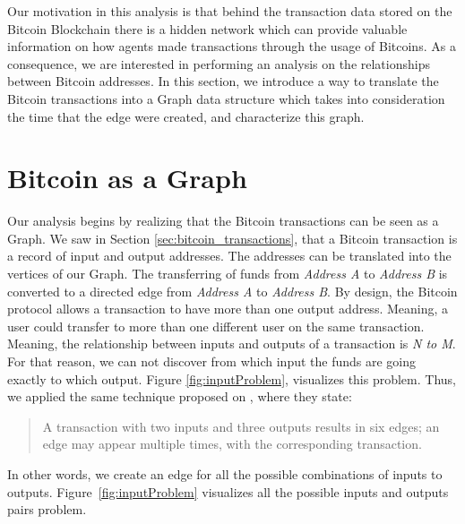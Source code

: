 \documentclass[../../thesis.tex]{subfiles}
\begin{document}
    Our motivation in this analysis is that behind the transaction data stored on the Bitcoin Blockchain there is a hidden network which can provide valuable information on how agents made transactions through the usage of Bitcoins. As a consequence, we are interested in performing an analysis on the relationships between Bitcoin addresses. In this section, we introduce a way to translate the Bitcoin transactions into a Graph data structure which takes into consideration the time that the edge were created, and characterize this graph.

\section{Bitcoin as a Graph}
\label{sec:bitcoin_as_a_graph}


Our analysis begins by realizing that the Bitcoin transactions can be seen as a Graph. We saw in Section \ref{sec:bitcoin_transactions}, that a Bitcoin transaction is a record of input and output addresses. The addresses can be translated into the vertices of our Graph. The transferring of funds from \textit{Address A} to \textit{Address B} is converted to a directed edge from \textit{Address A} to \textit{Address B}. By design, the Bitcoin protocol allows a transaction to have more than one output address. Meaning, a user could transfer to more than one different user on the same transaction. Meaning, the relationship between inputs and outputs of a transaction is \textit{N to M}. For that reason, we can not discover from which input the funds are going exactly to which output. Figure \ref{fig:inputProblem}, visualizes this problem. Thus, we applied the same technique proposed on \cite{networkStructureBitcoin, richGetRicher}, where they state: 

\begin{quotation}
  A transaction with two inputs and three outputs results in six edges; an edge may appear multiple times, with the corresponding transaction.
\end{quotation}
In other words, we create an edge for all the possible combinations of inputs to outputs. Figure~\ref{fig:inputProblem} visualizes all the possible inputs and outputs pairs problem.
\end{document}
